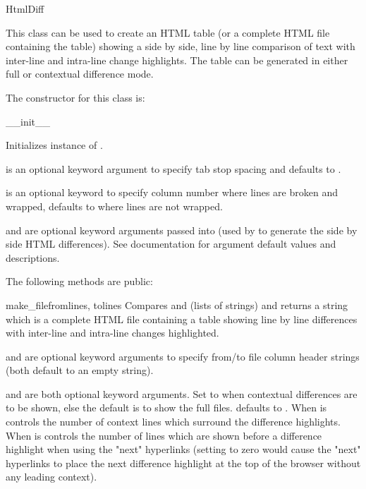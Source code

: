 \begin{classdesc*}{HtmlDiff}

  This class can be used to create an HTML table (or a complete HTML file
  containing the table) showing a side by side, line by line comparison
  of text with inter-line and intra-line change highlights.  The table can
  be generated in either full or contextual difference mode.

  The constructor for this class is:

  \begin{funcdesc}{__init__}{}

    Initializes instance of .

     is an optional keyword argument to specify tab stop spacing
    and defaults to .

     is an optional keyword to specify column number where
    lines are broken and wrapped, defaults to  where lines are not
    wrapped.

     and  are optional keyword arguments passed
    into  (used by  to generate the
    side by side HTML differences).  See  documentation for
    argument default values and descriptions.

  \end{funcdesc}

  The following methods are public:

  \begin{funcdesc}{make_file}{fromlines, tolines
    }
    Compares  and  (lists of strings) and returns
    a string which is a complete HTML file containing a table showing line by
    line differences with inter-line and intra-line changes highlighted.

     and  are optional keyword arguments to specify
    from/to file column header strings (both default to an empty string).

     and  are both optional keyword arguments.
    Set  to  when contextual differences are to be
    shown, else the default is  to show the full files.
     defaults to .  When  is 
     controls the number of context lines which surround the
    difference highlights.  When  is  
    controls the number of lines which are shown before a difference
    highlight when using the "next" hyperlinks (setting to zero would cause
    the "next" hyperlinks to place the next difference highlight at the top of
    the browser without any leading context).
  \end{funcdesc}


\end{classdesc*}
